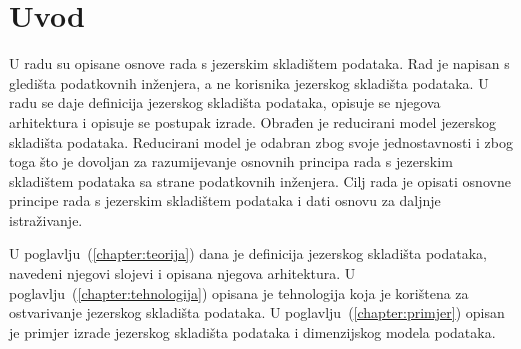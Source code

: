 \chapter{Uvod}

U radu su opisane osnove rada s jezerskim skladištem podataka. Rad je napisan s
gledišta podatkovnih inženjera, a ne korisnika jezerskog skladišta podataka. U
radu se daje definicija jezerskog skladišta podataka, opisuje se njegova
arhitektura i opisuje se postupak izrade. Obrađen je reducirani model jezerskog
skladišta podataka. Reducirani model je odabran zbog svoje jednostavnosti i zbog
toga što je dovoljan za razumijevanje osnovnih principa rada s jezerskim
skladištem podataka sa strane podatkovnih inženjera. Cilj rada je opisati
osnovne principe rada s jezerskim skladištem podataka i dati osnovu za daljnje
istraživanje.

U poglavlju~(\ref{chapter:teorija}) dana je definicija jezerskog skladišta
podataka, navedeni njegovi slojevi i opisana njegova arhitektura. U
poglavlju~(\ref{chapter:tehnologija}) opisana je tehnologija koja je korištena
za ostvarivanje jezerskog skladišta podataka. U
poglavlju~(\ref{chapter:primjer}) opisan je primjer izrade jezerskog skladišta
podataka i dimenzijskog modela podataka.
